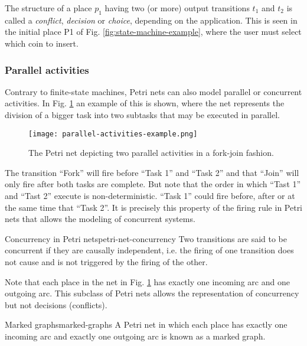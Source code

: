 The structure of a place $p_1$ having two (or more) output transitions $t_1$ and $t_2$ is called
a \emph{conflict}, \emph{decision} or \emph{choice}, depending on the application.
This is seen in the initial place \uppercase{P1} of Fig. \ref{fig:state-machine-example},
where the user must select which coin to insert.

\subsubsection{Parallel activities}

Contrary to finite-state machines, Petri nets can also model parallel or concurrent activities.
In Fig. \ref{fig:parallel-activities-example} an example of this is shown,
where the net represents the division of a bigger task into two subtasks that may be executed in parallel.

\begin{figure}[H]
    \centering
    \texttt{[image: parallel-activities-example.png]}
    \caption{The Petri net depicting two parallel activities in a fork-join fashion.}
    \label{fig:parallel-activities-example}
\end{figure}

The transition ``Fork'' will fire before ``Task 1'' and ``Task 2''
and that ``Join'' will only fire after both tasks are complete.
But note that the order in which ``Tast 1'' and ``Tast 2'' execute is non-deterministic.
``Task 1'' could fire before, after or at the same time that ``Task 2''.
It is precisely this property of the firing rule in Petri nets that allows the modeling of concurrent systems.

\begin{definition}{Concurrency in Petri nets}{petri-net-concurrency}
    Two transitions are said to be concurrent if they are causally independent, i.e.
    the firing of one transition does not cause and is not triggered by the firing of the other.
\end{definition}

Note that each place in the net in Fig. \ref{fig:parallel-activities-example} has exactly one incoming arc
and one outgoing arc.
This subclass of Petri nets allows the representation of concurrency but not decisions (conflicts).

\begin{definition}{Marked graphs}{marked-graphs}
    A Petri net in which each place has exactly one incoming arc
    and exactly one outgoing arc is known as a marked graph.
\end{definition}

